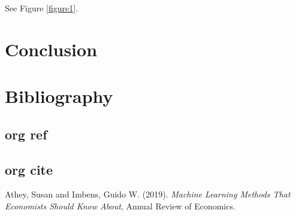 \documentclass[11pt]{article}
\begin{document}
See Figure \ref{figure1}.

\section{Conclusion}
\label{sec:org05aefe3}



\section{Bibliography}
\label{sec:org0df9e45}

\subsection{org ref}
\label{sec:org81dd431}



\subsection{org cite}
\label{sec:orgd3c1741}

\noindent
Athey, Susan and Imbens, Guido W. (2019). \emph{Machine Learning Methods That Economists Should Know About}, Annual Review of Economics.
\end{document}
